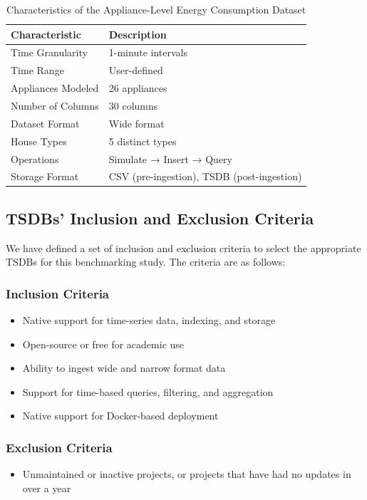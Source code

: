 \documentclass[conference]{IEEEtran}
\begin{document}
\begin{table}[tbp]
\caption{Characteristics of the Appliance-Level Energy Consumption Dataset}
\begin{center}
\begin{tabular}{|l|l|}
\hline
\textbf{Characteristic} & \textbf{Description} \\
\hline
Time Granularity & 1-minute intervals \\
Time Range & User-defined \\
Appliances Modeled & 26 appliances \\
Number of Columns & 30 columns \\
Dataset Format & Wide format \\
House Types & 5 distinct types \\
Operations & Simulate → Insert → Query \\
Storage Format & CSV (pre-ingestion), TSDB (post-ingestion) \\
\hline
\end{tabular}
\label{tab:dataset_characteristics}
\end{center}
\end{table}

\subsection{TSDBs' Inclusion and Exclusion Criteria}
We have defined a set of inclusion and exclusion criteria to select the appropriate TSDBs for this benchmarking study. The criteria are as follows:
\subsubsection{Inclusion Criteria}
\begin{itemize}
    \item Native support for time-series data, indexing, and storage
    \item Open-source or free for academic use
    \item Ability to ingest wide and narrow format data
    \item Support for time-based queries, filtering, and aggregation
    \item Native support for Docker-based deployment
\end{itemize}
\subsubsection{Exclusion Criteria}
\begin{itemize}
    \item Unmaintained or inactive projects, or projects that have had no updates in over a year
\end{itemize}
\end{document}
